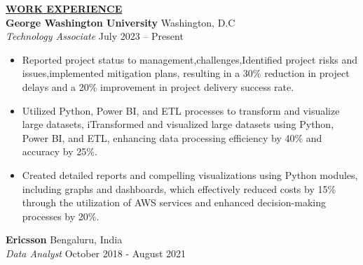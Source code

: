 \documentclass{article}
\begin{document}


% 
%
\noindent \textbf{\underline{WORK EXPERIENCE}} \\
\noindent \textbf{George Washington University} \hfill Washington, D.C \\
\textit{Technology Associate} \hfill July 2023 – Present
\begin{itemize}[noitemsep,nolistsep,leftmargin=*]
\item {Reported project status to management,challenges,Identified project risks and issues,implemented mitigation plans, resulting in a 30\% reduction in project delays and a 20\% improvement in project delivery success rate.}
\item {Utilized Python, Power BI, and ETL processes to transform and visualize large datasets, iTransformed and visualized large datasets using Python, Power BI, and ETL, enhancing data processing efficiency by 40\% and accuracy by 25\%.}
\item {Created detailed reports and compelling visualizations using Python modules, including graphs and dashboards, which effectively reduced costs by 15\% through the utilization of AWS services and enhanced decision-making processes by 20\%. }

\end{itemize}
\vspace{1mm}
\noindent \textbf{Ericsson} \hfill Bengaluru, India \\
\textit{Data Analyst} \hfill October 2018 - August 2021
\end{document}
